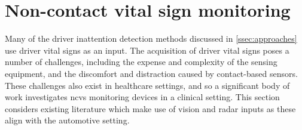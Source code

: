 \documentclass[11pt, parskip=half*,twoside=false]{scrbook}
\begin{document}
\section{Non-contact vital sign monitoring} \label{sec:vital_sign}
{}
%

Many of the driver inattention detection methods discussed in \cref{ssec:approaches} use driver vital signs as an input. The acquisition of driver vital signs poses a number of challenges, including the expense and complexity of the sensing equipment, and the discomfort and distraction caused by contact-based sensors. These challenges also exist in healthcare settings, and so a significant body of work investigates \gls{ncvs} monitoring devices in a clinical setting. This section considers existing literature which make use of vision and radar inputs as these align with the automotive setting.

%
%

\end{document}

